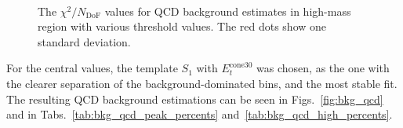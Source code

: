\begin{figure}
{
 \\
\caption{The $\chi^2/N_\mathrm{DoF}$ values for QCD background estimates in high-mass region with various threshold values. The red dots show one standard deviation.}
\label{fig:qcd_high__chi}}
\end{figure}

For the central values, the template $S_{1}$ with $E_{t}^{\mathrm{cone30}}$ was chosen, as the one with the clearer separation of the background-dominated bins, and the most stable fit. The resulting QCD background estimations can be seen in Figs.~\ref{fig:bkg_qcd} and in Tabs.~\ref{tab:bkg_qcd_peak_percents} and~\ref{tab:bkg_qcd_high_percents}.

